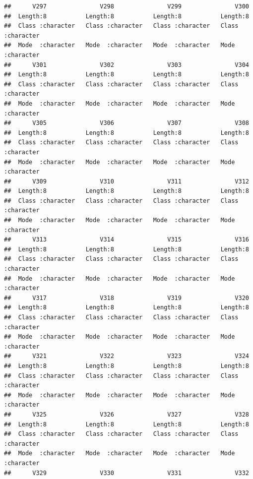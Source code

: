\documentclass[
]{article}
\begin{document}
\begin{verbatim}
##      V297               V298               V299               V300          
##  Length:8           Length:8           Length:8           Length:8          
##  Class :character   Class :character   Class :character   Class :character  
##  Mode  :character   Mode  :character   Mode  :character   Mode  :character  
##      V301               V302               V303               V304          
##  Length:8           Length:8           Length:8           Length:8          
##  Class :character   Class :character   Class :character   Class :character  
##  Mode  :character   Mode  :character   Mode  :character   Mode  :character  
##      V305               V306               V307               V308          
##  Length:8           Length:8           Length:8           Length:8          
##  Class :character   Class :character   Class :character   Class :character  
##  Mode  :character   Mode  :character   Mode  :character   Mode  :character  
##      V309               V310               V311               V312          
##  Length:8           Length:8           Length:8           Length:8          
##  Class :character   Class :character   Class :character   Class :character  
##  Mode  :character   Mode  :character   Mode  :character   Mode  :character  
##      V313               V314               V315               V316          
##  Length:8           Length:8           Length:8           Length:8          
##  Class :character   Class :character   Class :character   Class :character  
##  Mode  :character   Mode  :character   Mode  :character   Mode  :character  
##      V317               V318               V319               V320          
##  Length:8           Length:8           Length:8           Length:8          
##  Class :character   Class :character   Class :character   Class :character  
##  Mode  :character   Mode  :character   Mode  :character   Mode  :character  
##      V321               V322               V323               V324          
##  Length:8           Length:8           Length:8           Length:8          
##  Class :character   Class :character   Class :character   Class :character  
##  Mode  :character   Mode  :character   Mode  :character   Mode  :character  
##      V325               V326               V327               V328          
##  Length:8           Length:8           Length:8           Length:8          
##  Class :character   Class :character   Class :character   Class :character  
##  Mode  :character   Mode  :character   Mode  :character   Mode  :character  
##      V329               V330               V331               V332          

\end{verbatim}
\end{document}
